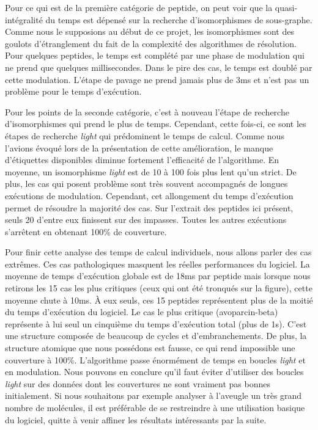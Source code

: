 Pour ce qui est de la première catégorie de peptide, on peut voir que la quasi-intégralité du temps est dépensé sur la recherche d'isomorphismes de sous-graphe.
Comme nous le supposions au début de ce projet, les isomorphismes sont des goulots d'étranglement du fait de la complexité des algorithmes de résolution.
Pour quelques peptides, le temps est complété par une phase de modulation qui ne prend que quelques millisecondes.
Dans le pire des cas, le temps est doublé par cette modulation.
L'étape de pavage ne prend jamais plus de 3ms et n'est pas un problème pour le temps d'exécution.

Pour les points de la seconde catégorie, c'est à nouveau l'étape de recherche d'isomorphismes qui prend le plus de temps.
Cependant, cette fois-ci, ce sont les étapes de recherche \textit{light} qui prédominent le temps de calcul.
Comme nous l'avions évoqué lors de la présentation de cette amélioration, le manque d'étiquettes disponibles diminue fortement l'efficacité de l'algorithme.
En moyenne, un isomorphisme \textit{light} est de 10 à 100 fois plus lent qu'un strict.
De plus, les cas qui posent problème sont très souvent accompagnés de longues exécutions de modulation.
Cependant, cet allongement du temps d'exécution permet de résoudre la majorité des cas.
Sur l'extrait des peptides ici présent, seuls 20 d'entre eux finissent sur des impasses.
Toutes les autres exécutions s'arrêtent en obtenant 100\% de couverture.

Pour finir cette analyse des temps de calcul individuels, nous allons parler des cas extrêmes.
Ces cas pathologiques masquent les réelles performances du logiciel.
La moyenne de temps d'exécution globale est de 18ms par peptide mais lorsque nous retirons les 15 cas les plus critiques (ceux qui ont été tronqués sur la figure), cette moyenne chute à 10ms.
À eux seuls, ces 15 peptides représentent plus de la moitié du temps d'exécution du logiciel.
Le cas le plus critique (avoparcin-beta) représente à lui seul un cinquième du temps d'exécution total (plus de 1s).
C'est une structure composée de beaucoup de cycles et d'embranchements. De plus, la structure atomique que nous possédons est fausse, ce qui rend impossible une couverture à 100\%.
L'algorithme passe énormément de temps en boucles \textit{light} et en modulation.
Nous pouvons en conclure qu'il faut éviter d'utiliser des boucles \textit{light} sur des données dont les couvertures ne sont vraiment pas bonnes initialement.
Si nous souhaitons par exemple analyser à l'aveugle un très grand nombre de molécules, il est préférable de se restreindre à une utilisation basique du logiciel, quitte à venir affiner les résultats intéressants par la suite.








